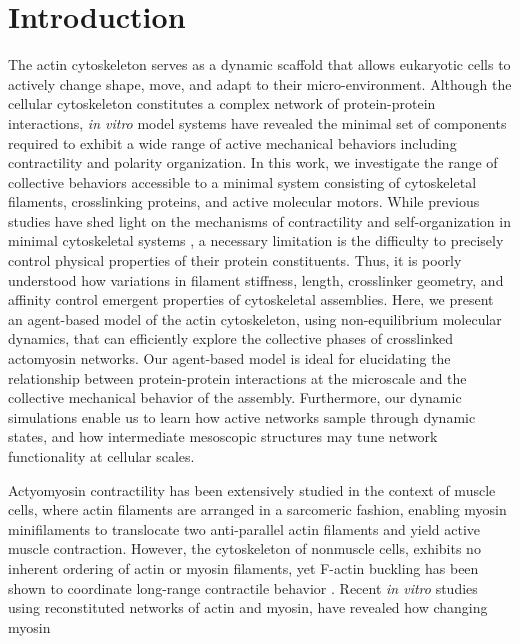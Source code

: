 \documentclass[12pt]{article}
\begin{document}
\section{Introduction} 
The actin cytoskeleton serves as a dynamic scaffold that allows eukaryotic cells
to actively change shape, move, and adapt to their micro-environment. Although 
the cellular cytoskeleton constitutes a complex network of protein-protein
interactions, {\em in vitro} model systems have revealed the minimal set of 
components required to exhibit a wide range of active mechanical behaviors 
including contractility and polarity organization\cite{murrell2012,murrell2014,
takiguchi1991}. In this work, we investigate the range of collective behaviors 
accessible to a minimal system consisting of cytoskeletal filaments, 
crosslinking proteins, and active molecular motors. While previous studies have 
shed light on the mechanisms of contractility and self-organization in minimal 
cytoskeletal systems \cite{takiguchi1991,nedelec2002,dasanyake2011,murrell2012,wang2012,ennomani2016}, 
a necessary limitation is the difficulty to precisely control physical 
properties of their protein constituents. Thus, it is poorly understood how 
variations in filament stiffness, length, crosslinker geometry, and affinity 
control emergent properties of cytoskeletal assemblies.  
Here, we present an agent-based model of the actin cytoskeleton, using
non-equilibrium molecular dynamics, that can efficiently explore the 
collective phases of crosslinked actomyosin networks. Our agent-based model is
ideal for elucidating the relationship between protein-protein interactions at
the microscale and the collective mechanical behavior of the assembly.
Furthermore, our dynamic simulations enable us to learn how active networks 
sample through dynamic states, and how intermediate mesoscopic structures may 
tune network functionality at cellular scales.
\par
Actyomyosin contractility has been extensively studied in the context of  muscle
cells, where actin filaments are arranged in a sarcomeric fashion, enabling 
myosin minifilaments to translocate two anti-parallel actin filaments and yield 
active muscle contraction\cite{huxley1969}. However, the cytoskeleton of 
nonmuscle cells, exhibits no inherent ordering of actin or myosin filaments, yet
F-actin buckling has been shown to coordinate long-range contractile behavior 
\cite{lenz2012,murrell2012,murrell2015}.
Recent {\em in vitro} studies using 
reconstituted networks of actin and myosin, have revealed how changing myosin 
\end{document}
